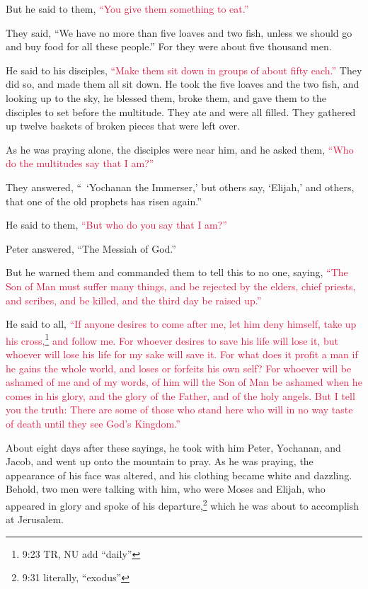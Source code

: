 \myverse{}But he said to them,
\textcolor{crimson}{“You give them something to eat.”}

They said, “We have no more than five loaves and two fish, unless we should go and buy food
for all these people.”
\myverse{}For they were about five thousand men.

He said to his disciples,
\textcolor{crimson}{“Make them sit down in groups of about fifty each.”}
\myverse{}They did so, and made them all sit down.
\myverse{}He took the five loaves and the two fish, and looking up to the sky, he blessed
them, broke them, and gave them to the disciples to set before the multitude.
\myverse{}They ate and were all filled. They gathered up twelve baskets of broken pieces
that were left over.

\myverse{}As he was praying alone, the disciples were near him, and he
asked them,
\textcolor{crimson}{“Who do the multitudes say that I am?”}

\myverse{}They answered, “ ‘Yochanan the Immerser,’ but others say, ‘Elijah,’
and others, that one of the old prophets has risen again.”

\myverse{}He said to them,
\textcolor{crimson}{“But who do you say that I am?”}

Peter answered, “The Messiah of God.”

\myverse{}But he warned them and commanded them to tell this to no one,
\myverse{}saying,
\textcolor{crimson}{“The Son of Man must suffer many things, and be rejected by the elders, chief priests, and scribes,
	and be killed, and the third day be raised up.”}

\myverse{}He said to all,
\textcolor{crimson}{“If anyone desires to come after me, let him deny himself, take up his cross,}\footnote{9:23 TR, NU add “daily”}
\textcolor{crimson}{and follow me.
}
\myverse{}\textcolor{crimson}{For whoever desires to save his life will lose it, but whoever will lose
	his life for my sake will save it.
}
\myverse{}\textcolor{crimson}{For what does it profit a man if he gains the whole world, and loses or
	forfeits his own self?
}
\myverse{}\textcolor{crimson}{For whoever will be ashamed of me and of my words, of him will the Son
	of Man be ashamed when he comes in his glory, and the glory of the Father, and of the holy angels.
}
\myverse{}\textcolor{crimson}{But I tell you the truth: There are some of those who stand here who will
	in no way taste of death until they see God’s Kingdom.”
}

\myverse{}About eight days after these sayings, he took with him Peter,
Yochanan, and Jacob, and went up onto the mountain to pray.
\myverse{}As he was praying, the appearance of his face was altered, and his clothing
became white and dazzling.
\myverse{}Behold, two men were talking with him, who were Moses and Elijah,
\myverse{}who appeared in glory and spoke of his departure,\footnote{9:31 literally, “exodus”} which he was about to accomplish at Jerusalem.

